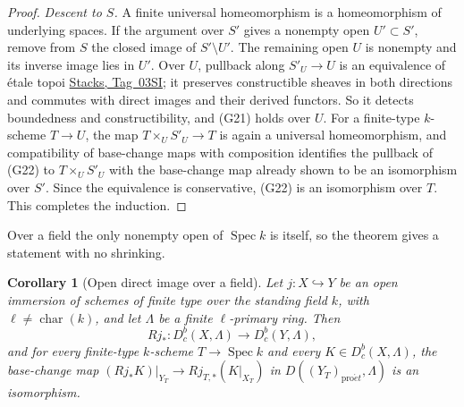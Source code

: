 \documentclass[11pt,a4paper]{article}
\numberwithin{equation}{section}
\newtheorem{corollary}[theorem]{Corollary}
\theoremstyle{definition}
\theoremstyle{remark}
\newcommand{\Dbc}{D^b_c}
\newcommand{\proet}{\mathrm{pro}\acute{e}t}
\newcommand{\stacks}[1]{\href{https://stacks.math.columbia.edu/tag/#1}{\textnormal{Stacks, Tag~#1}}}
\begin{document}
\begin{proof}
\emph{Descent to \(S\).} A finite universal homeomorphism is a
homeomorphism of underlying spaces. If the argument over \(S'\) gives a
nonempty open \(U'\subset S'\), remove from \(S\) the closed image of
\(S'\setminus U'\). The remaining open \(U\) is nonempty and its inverse
image lies in \(U'\). Over \(U\), pullback along \(S'_U\to U\) is an
equivalence of \'etale topoi \stacks{03SI}; it preserves constructible
sheaves in both directions and commutes with direct images and their
derived functors. So it detects boundedness and constructibility, and
(G21) holds over \(U\). For a finite-type $k$-scheme \(T\to U\), the map
\(T\times_US'_U\to T\) is again a universal homeomorphism, and
compatibility of base-change maps with composition identifies the
pullback of (G22) to \(T\times_US'_U\) with the base-change map already
shown to be an isomorphism over \(S'\). Since the equivalence is
conservative, (G22) is an isomorphism over \(T\). This completes the
induction.
\end{proof}

Over a field the only nonempty open of \(\operatorname{Spec}k\) is
itself, so the theorem gives a statement with no shrinking.

\begin{corollary}[Open direct image over a field]
\label{b:cor:geo-open-finiteness}
\label{b:thm:finite-open}
Let \(j:X\hookrightarrow Y\) be an open immersion of schemes of finite
type over the standing field \(k\), with \(\ell\ne\operatorname{char}(k)\), and let
\(\Lambda\) be a finite \(\ell\)-primary ring. Then
\[
 Rj_*:\Dbc(X,\Lambda)\longrightarrow\Dbc(Y,\Lambda),
                                                               \tag{G25}
\]
and for every finite-type $k$-scheme \(T\to\operatorname{Spec}k\) and every
\(K\in\Dbc(X,\Lambda)\), the base-change map
\((Rj_*K)|_{Y_T}\to Rj_{T,*}(K|_{X_T})\) in \(D((Y_T)_{\proet},\Lambda)\)
is an isomorphism.
\end{corollary}
\end{document}
